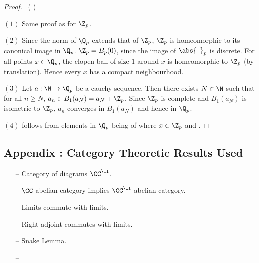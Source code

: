 \begin{proof}~(
)
  
  $(1)$ Same proof as for $\Z_p$.
  
  $(2)$ Since the norm of $\Q_p$ extends that of $\Z_p$, 
  $\Z_p$ is homeomorphic to its canonical image in $\Q_p$. 
  $\Z_p = B_{p}(0)$, since the image of $\abs{\hspace{5pt}}_p$ is discrete. 
  For all points $x \in \Q_p$, 
  the clopen ball of size $1$ around $x$ is homeomorphic to $\Z_p$ 
  (by translation).
  Hence every $x$ has a compact neighbourhood. 

  $(3)$ Let $a : \N \to \Q_p$ be a cauchy sequence. 
  Then there exists $N \in \N$ such that for all $n \geq N$, 
  $a_n \in B_1(a_N) = a_N + \Z_p$. 
  Since $\Z_p$ is complete and $B_1(a_N)$ is isometric to $\Z_p$,
  $a_n$ converges in $B_1(a_N)$
  and hence in $\Q_p$. 

  $(4)$ follows from elements in $\Q_p$ being 
  of 
  where $x \in \Z_p$ and 
  . 
\end{proof}

\subsection{Appendix : Category Theoretic Results Used}

\begin{itemize}
  \item[--] Category of diagrams $\CC^\II$.
  \item[--] $\CC$ abelian category implies $\CC^\II$ abelian category. 
  \item[--] Limits commute with limits. 
  \item[--] Right adjoint commutes with limits. 
  \item[--] Snake Lemma. 
  \item[--] 
\end{itemize}